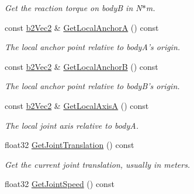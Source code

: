 \begin{DoxyCompactItemize}
\begin{DoxyCompactList}\small\item\em Get the reaction torque on body\-B in N$\ast$m. \end{DoxyCompactList}\item 
\hypertarget{classb2_wheel_joint_abf725ee0fa640d1b9374283f6f50e82d}{const \hyperlink{structb2_vec2}{b2\-Vec2} \& \hyperlink{classb2_wheel_joint_abf725ee0fa640d1b9374283f6f50e82d}{Get\-Local\-Anchor\-A} () const }\label{classb2_wheel_joint_abf725ee0fa640d1b9374283f6f50e82d}

\begin{DoxyCompactList}\small\item\em The local anchor point relative to body\-A's origin. \end{DoxyCompactList}\item 
\hypertarget{classb2_wheel_joint_a38313bcd5d5a91f190956086b9d9b8e5}{const \hyperlink{structb2_vec2}{b2\-Vec2} \& \hyperlink{classb2_wheel_joint_a38313bcd5d5a91f190956086b9d9b8e5}{Get\-Local\-Anchor\-B} () const }\label{classb2_wheel_joint_a38313bcd5d5a91f190956086b9d9b8e5}

\begin{DoxyCompactList}\small\item\em The local anchor point relative to body\-B's origin. \end{DoxyCompactList}\item 
\hypertarget{classb2_wheel_joint_a03c1a1cf19dbada68630aa3cbf970a55}{const \hyperlink{structb2_vec2}{b2\-Vec2} \& \hyperlink{classb2_wheel_joint_a03c1a1cf19dbada68630aa3cbf970a55}{Get\-Local\-Axis\-A} () const }\label{classb2_wheel_joint_a03c1a1cf19dbada68630aa3cbf970a55}

\begin{DoxyCompactList}\small\item\em The local joint axis relative to body\-A. \end{DoxyCompactList}\item 
\hypertarget{classb2_wheel_joint_abc3791f9c8139e5c5ba0fb72d5c7f9df}{float32 \hyperlink{classb2_wheel_joint_abc3791f9c8139e5c5ba0fb72d5c7f9df}{Get\-Joint\-Translation} () const }\label{classb2_wheel_joint_abc3791f9c8139e5c5ba0fb72d5c7f9df}

\begin{DoxyCompactList}\small\item\em Get the current joint translation, usually in meters. \end{DoxyCompactList}\item 
\hypertarget{classb2_wheel_joint_a398bc3a1f807905e0923cc7d9bff640d}{float32 \hyperlink{classb2_wheel_joint_a398bc3a1f807905e0923cc7d9bff640d}{Get\-Joint\-Speed} () const }\label{classb2_wheel_joint_a398bc3a1f807905e0923cc7d9bff640d}


\end{DoxyCompactItemize}
